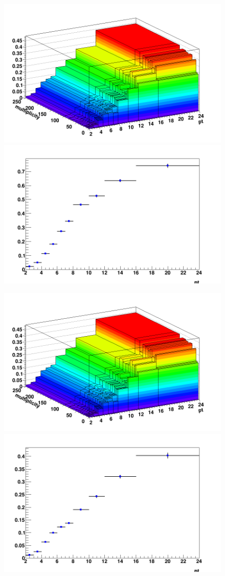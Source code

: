 \begin{figure}[h]   %
	\centering
	
	\includegraphics[width=.48\linewidth]{figuresVsCent/Dzero/EffAndFeed/EfficiencyMap_2D_Dzero_c_RefPtBins_Cuts020_MultWeig_wLimAcc_Plot.png}
	\includegraphics[width=.48\linewidth]{figuresVsCent/Dstar/EffAndFeed/EfficiencyMap_1D_DStar_c_020_ZNA_wLimAcc_Plot.png
}

	\includegraphics[width=.48\linewidth]{figuresVsCent/Dzero/EffAndFeed/EfficiencyMap_2D_Dzero_c_RefPtBins_Cuts020_MultWeig_wLimAcc_Plot.png
}
	\includegraphics[width=.48\linewidth]{figuresVsCent/Dzero/EffAndFeed/EfficiencyMap_1D_Dzero_c_RefPtBins_Cuts020_MultWeig_wLimAcc_Plot.png
}


\end{figure}

